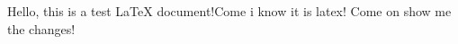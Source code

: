 \documentclass{article}
\begin{document}
Hello, this is a test LaTeX document!Come i know it is latex! Come on show me the changes! 
\end{document}
